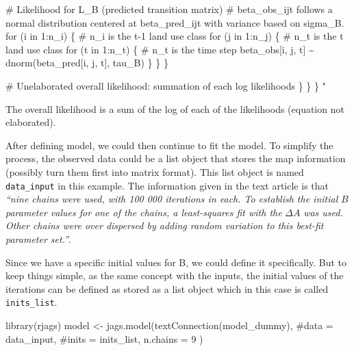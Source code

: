 \documentclass[
  letterpaper,
  DIV=11,
  numbers=noendperiod]{scrartcl}
\newenvironment{Shaded}{\begin{snugshade}}{\end{snugshade}}
\newcommand{\AttributeTok}[1]{\textcolor[rgb]{0.40,0.45,0.13}{#1}}
\newcommand{\CommentTok}[1]{\textcolor[rgb]{0.37,0.37,0.37}{#1}}
\newcommand{\DecValTok}[1]{\textcolor[rgb]{0.68,0.00,0.00}{#1}}
\newcommand{\FunctionTok}[1]{\textcolor[rgb]{0.28,0.35,0.67}{#1}}
\newcommand{\NormalTok}[1]{\textcolor[rgb]{0.00,0.23,0.31}{#1}}
\newcommand{\OtherTok}[1]{\textcolor[rgb]{0.00,0.23,0.31}{#1}}
\newcommand{\StringTok}[1]{\textcolor[rgb]{0.13,0.47,0.30}{#1}}
\begin{document}
\begin{Shaded}
\begin{Highlighting}[]
\StringTok{\# Likelihood for L\_B (predicted transition matrix)}
\StringTok{\# beta\_obs\_ijt follows a normal distribution centered at beta\_pred\_ijt with variance based on sigma\_B.}
\StringTok{for (i in 1:n\_i) \{ \# n\_i is the t{-}1 land use class}
\StringTok{  for (j in 1:n\_j) \{ \# n\_t is the t land use class}
\StringTok{    for (t in 1:n\_t) \{ \# n\_t is the time step}
\StringTok{      beta\_obs[i, j, t] \textasciitilde{} dnorm(beta\_pred[i, j, t], tau\_B)}
\StringTok{    \}}
\StringTok{  \}}
\StringTok{\}}

\StringTok{\# Unelaborated overall likelihood: summation of each log likelihoods}
\StringTok{\}}
\StringTok{  \}}
\StringTok{\} "}
\end{Highlighting}
\end{Shaded}

The overall likelihood is a sum of the log of each of the likelihoods
(equation not elaborated).

After defining model, we could then continue to fit the model. To
simplify the process, the observed data could be a list object that
stores the map information (possibly turn them first into matrix
format). This list object is named \texttt{data\_input} in this example.
The information given in the text article is that \emph{``nine chains
were used, with 100 000 iterations in each. To establish the initial}
\(B\) \emph{parameter values for one of the chains, a least-squares fit
with the} \(\Delta{A}\) \emph{was used. Other chains were over dispersed
by adding random variation to this best-fit parameter set.''}.

Since we have a specific initial values for B, we could define it
specifically. But to keep things simple, as the same concept with the
inputs, the initial values of the iterations can be defined as stored as
a list object which in this case is called \texttt{inits\_list}.

\begin{Shaded}
\begin{Highlighting}[]
\FunctionTok{library}\NormalTok{(rjags)}
\NormalTok{model }\OtherTok{\textless{}{-}} \FunctionTok{jags.model}\NormalTok{(}\FunctionTok{textConnection}\NormalTok{(model\_dummy), }
                    \CommentTok{\#data = data\_input, }
                    \CommentTok{\#inits = inits\_list, }
                    \AttributeTok{n.chains =} \DecValTok{9}
\NormalTok{                    )}
\end{Highlighting}
\end{Shaded}
\end{document}
